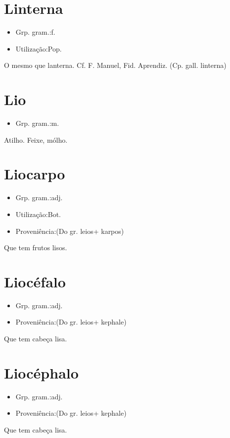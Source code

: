 \section{Linterna}
\begin{itemize}
\item {Grp. gram.:f.}
\end{itemize}
\begin{itemize}
\item {Utilização:Pop.}
\end{itemize}
O mesmo que \textunderscore lanterna\textunderscore . Cf. F. Manuel, \textunderscore Fid. Aprendiz\textunderscore .
(Cp. gall. \textunderscore linterna\textunderscore )
\section{Lio}
\begin{itemize}
\item {Grp. gram.:m.}
\end{itemize}
Atilho.
Feixe, mólho.
\section{Liocarpo}
\begin{itemize}
\item {Grp. gram.:adj.}
\end{itemize}
\begin{itemize}
\item {Utilização:Bot.}
\end{itemize}
\begin{itemize}
\item {Proveniência:(Do gr. \textunderscore leios\textunderscore  + \textunderscore karpos\textunderscore )}
\end{itemize}
Que tem frutos lisos.
\section{Liocéfalo}
\begin{itemize}
\item {Grp. gram.:adj.}
\end{itemize}
\begin{itemize}
\item {Proveniência:(Do gr. \textunderscore leios\textunderscore  + \textunderscore kephale\textunderscore )}
\end{itemize}
Que tem cabeça lisa.
\section{Liocéphalo}
\begin{itemize}
\item {Grp. gram.:adj.}
\end{itemize}
\begin{itemize}
\item {Proveniência:(Do gr. \textunderscore leios\textunderscore  + \textunderscore kephale\textunderscore )}
\end{itemize}
Que tem cabeça lisa.

